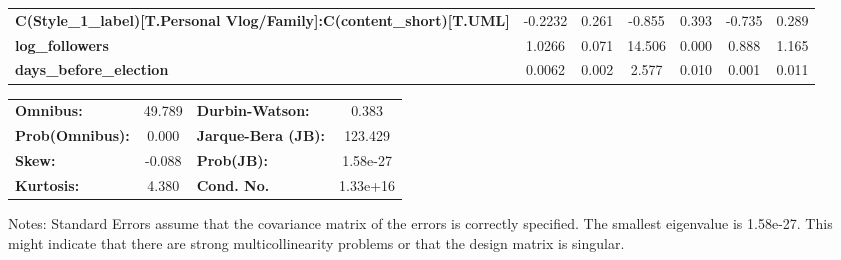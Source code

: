 \begin{center}
\begin{tabular}{lcccccc}
\textbf{C(Style\_1\_label)[T.Personal Vlog/Family]:C(content\_short)[T.UML]}         &      -0.2232  &        0.261     &    -0.855  &         0.393        &       -0.735    &        0.289     \\
\textbf{log\_followers}                                                              &       1.0266  &        0.071     &    14.506  &         0.000        &        0.888    &        1.165     \\
\textbf{days\_before\_election}                                                      &       0.0062  &        0.002     &     2.577  &         0.010        &        0.001    &        0.011     \\
\bottomrule
\end{tabular}
\begin{tabular}{lclc}
\textbf{Omnibus:}       & 49.789 & \textbf{  Durbin-Watson:     } &    0.383  \\
\textbf{Prob(Omnibus):} &  0.000 & \textbf{  Jarque-Bera (JB):  } &  123.429  \\
\textbf{Skew:}          & -0.088 & \textbf{  Prob(JB):          } & 1.58e-27  \\
\textbf{Kurtosis:}      &  4.380 & \textbf{  Cond. No.          } & 1.33e+16  \\
\bottomrule
\end{tabular}
\end{center}

Notes: \newline
 [1] Standard Errors assume that the covariance matrix of the errors is correctly specified. \newline
 [2] The smallest eigenvalue is 1.58e-27. This might indicate that there are \newline
 strong multicollinearity problems or that the design matrix is singular.